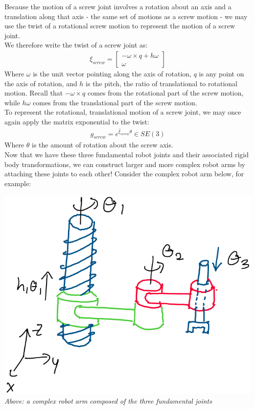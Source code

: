 \documentclass[oneside]{book}
\begin{document}
Because the motion of a screw joint involves a rotation about an axis and a translation along that axis - the same set of motions as a screw motion - we may use the twist of a rotational screw motion to represent the motion of a screw joint.\\
We therefore write the twist of a screw joint as:
\begin{align}
    \xi_{screw} = 
    \begin{bmatrix}
        -\omega \times q + h\omega\\
        \omega
    \end{bmatrix}
\end{align}
Where $\omega$ is the unit vector pointing along the axis of rotation, $q$ is any point on the axis of rotation, and $h$ is the pitch, the ratio of translational to rotational motion. Recall that $-\omega \times q$ comes from the rotational part of the screw motion, while $h\omega$ comes from the translational part of the screw motion. \\
To represent the rotational, translational motion of a screw joint, we may once again apply the matrix exponential to the twist:
\begin{align}
    g_{screw} = e^{\hat\xi_{screw} \theta} \in SE(3)
\end{align}
Where $\theta$ is the amount of rotation about the screw axis.\\
Now that we have these three fundamental robot joints and their associated rigid body transformations, we can construct larger and more complex robot arms by attaching these joints to each other! Consider the complex robot arm below, for example:
\begin{center}
    \includegraphics[scale=0.3]{images/complexJoints.png}\\
    \textit{Above: a complex robot arm composed of the three fundamental joints}
\end{center}
\end{document}

